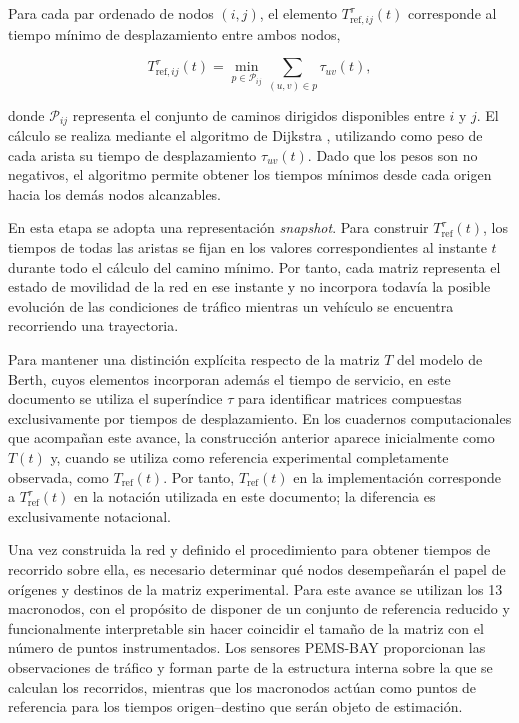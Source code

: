 \documentclass[11pt]{article}
\begin{document}
Para cada par ordenado de nodos $(i,j)$, el elemento $T^\tau_{\mathrm{ref},ij}(t)$ corresponde al tiempo mínimo de desplazamiento entre ambos nodos,

\[
T^\tau_{\mathrm{ref},ij}(t)
=
\min_{p\in\mathcal{P}_{ij}}
\sum_{(u,v)\in p}
\tau_{uv}(t),
\]

donde $\mathcal{P}_{ij}$ representa el conjunto de caminos dirigidos disponibles entre $i$ y $j$. El cálculo se realiza mediante el algoritmo de Dijkstra \parencite{dijkstra1959note}, utilizando como peso de cada arista su tiempo de desplazamiento $\tau_{uv}(t)$. Dado que los pesos son no negativos, el algoritmo permite obtener los tiempos mínimos desde cada origen hacia los demás nodos alcanzables.

En esta etapa se adopta una representación \textit{snapshot}. Para construir $T^\tau_{\mathrm{ref}}(t)$, los tiempos de todas las aristas se fijan en los valores correspondientes al instante $t$ durante todo el cálculo del camino mínimo. Por tanto, cada matriz representa el estado de movilidad de la red en ese instante y no incorpora todavía la posible evolución de las condiciones de tráfico mientras un vehículo se encuentra recorriendo una trayectoria.

Para mantener una distinción explícita respecto de la matriz $T$ del modelo de Berth, cuyos elementos incorporan además el tiempo de servicio, en este documento se utiliza el superíndice $\tau$ para identificar matrices compuestas exclusivamente por tiempos de desplazamiento. En los cuadernos computacionales que acompañan este avance, la construcción anterior aparece inicialmente como $T(t)$ y, cuando se utiliza como referencia experimental completamente observada, como $T_{\mathrm{ref}}(t)$. Por tanto, $T_{\mathrm{ref}}(t)$ en la implementación corresponde a $T^\tau_{\mathrm{ref}}(t)$ en la notación utilizada en este documento; la diferencia es exclusivamente notacional.

Una vez construida la red y definido el procedimiento para obtener tiempos de recorrido sobre ella, es necesario determinar qué nodos desempeñarán el papel de orígenes y destinos de la matriz experimental. Para este avance se utilizan los 13 macronodos, con el propósito de disponer de un conjunto de referencia reducido y funcionalmente interpretable sin hacer coincidir el tamaño de la matriz con el número de puntos instrumentados. Los sensores PEMS-BAY proporcionan las observaciones de tráfico y forman parte de la estructura interna sobre la que se calculan los recorridos, mientras que los macronodos actúan como puntos de referencia para los tiempos origen--destino que serán objeto de estimación.
\end{document}
